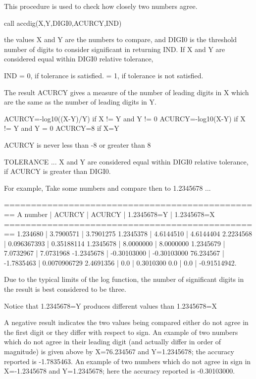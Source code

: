 \begin{DoxyVerb}This procedure is used to check how closely two numbers agree.

   call accdig(X,Y,DIGI0,ACURCY,IND)

the values X and Y are the numbers to compare, and DIGI0 is the
threshold number of digits to consider significant in returning IND.
If X and Y are considered equal within DIGI0 relative tolerance,

    IND    = 0, if tolerance is     satisfied.
           = 1, if tolerance is not satisfied.

The result ACURCY gives a measure of the number of leading digits in X
which are the same as the number of leading digits in Y.

        ACURCY=-log10((X-Y)/Y)   if X != Y and Y != 0
        ACURCY=-log10(X-Y)       if X != Y and Y = 0
        ACURCY=8                 if X=Y

        ACURCY is never less than -8 or greater than 8

TOLERANCE ...
     X and Y are considered equal within DIGI0 relative tolerance,
     if ACURCY is greater than DIGI0.

For example, Take some numbers and compare then  to 1.2345678 ...

   ================================================
   A number     |    ACURCY       |   ACURCY
                |    1.2345678=Y  |   1.2345678=X
   ================================================
    1.234680    |    3.7900571    |   3.7901275
    1.2345378   |    4.6144510    |   4.6144404
    2.2234568   |    0.096367393  |   0.35188114
    1.2345678   |    8.0000000    |   8.0000000
    1.2345679   |    7.0732967    |   7.0731968
   -1.2345678   |   -0.30103000   |  -0.30103000
   76.234567    |   -1.7835463    |   0.0070906729
    2.4691356   |    0.0          |   0.3010300
    0.0         |    0.0          |  -0.91514942.

Due to the typical limits of the log function, the number of
significant digits in the result is best considered to be three.

Notice that 1.2345678=Y produces different values than 1.2345678=X

A negative result indicates the two values being compared either do
not agree in the first digit or they differ with respect to sign. An
example of two numbers which do not agree in their leading digit (and
actually differ in order of magnitude) is given above by X=76.234567
and Y=1.2345678; the accuracy reported is -1.7835463. An example of
two numbers which do not agree in sign in X=-1.2345678 and Y=1.2345678;
here the accuracy reported is -0.30103000.
\end{DoxyVerb}


